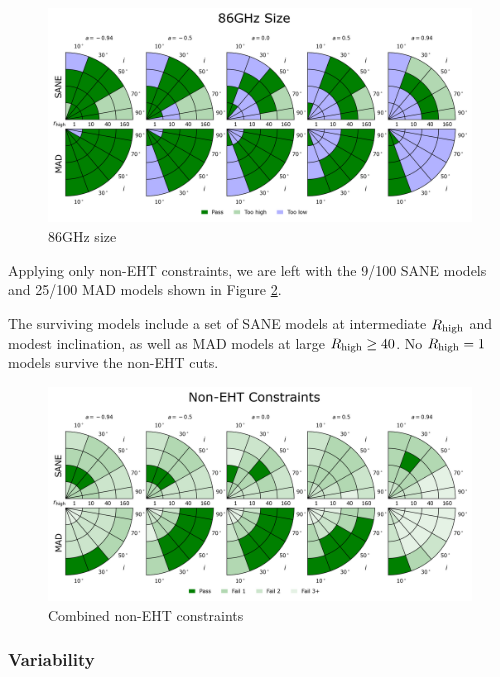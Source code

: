 \begin{figure}
  \centering
  \includegraphics[width=\columnwidth]{./figures/86GHz_size_Constraints.png}
  \caption{86GHz size}
  \label{fig:cmp_86ghz_size}
\end{figure}


Applying only non-EHT constraints, we are left with the 9/100 SANE models and 25/100 MAD models shown in Figure \ref{fig:non_eht_cuts}.

The surviving models include a set of SANE models at intermediate $R_\mathrm{high}$ and modest inclination, as well as MAD models at large $R_\mathrm{high} \ge 40$.  No $R_\mathrm{high} = 1$ models survive the non-EHT cuts.

\begin{figure}
  \centering
  \includegraphics[width=\columnwidth]{./figures/Non_Interferometric_Constraints.png}
  \caption{Combined non-EHT constraints}
  \label{fig:non_eht_cuts}
\end{figure}

\subsubsection{Variability}

